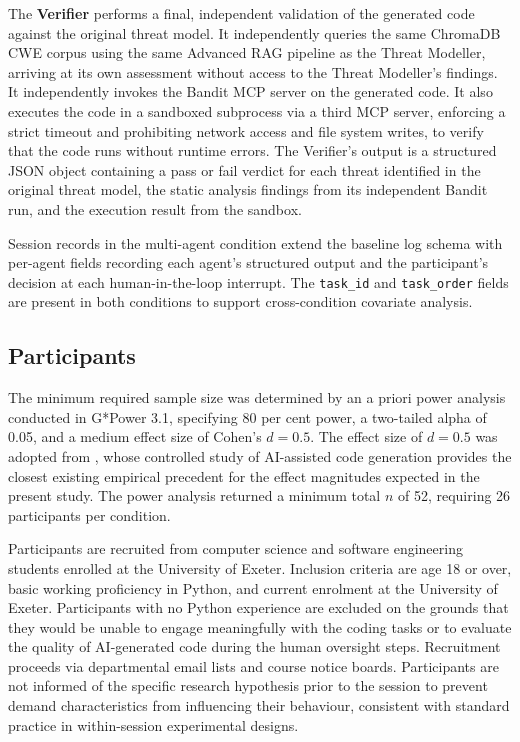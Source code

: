 The \textbf{Verifier} performs a final, independent validation of the generated code against the original threat model. It independently queries the same ChromaDB CWE corpus using the same Advanced RAG pipeline as the Threat Modeller, arriving at its own assessment without access to the Threat Modeller's findings. It independently invokes the Bandit MCP server on the generated code. It also executes the code in a sandboxed subprocess via a third MCP server, enforcing a strict timeout and prohibiting network access and file system writes, to verify that the code runs without runtime errors. The Verifier's output is a structured JSON object containing a pass or fail verdict for each threat identified in the original threat model, the static analysis findings from its independent Bandit run, and the execution result from the sandbox.

Session records in the multi-agent condition extend the baseline log schema with per-agent fields recording each agent's structured output and the participant's decision at each human-in-the-loop interrupt. The \texttt{task\_id} and \texttt{task\_order} fields are present in both conditions to support cross-condition covariate analysis.

\subsection{Participants}

The minimum required sample size was determined by an a priori power analysis conducted in G*Power 3.1, specifying 80 per cent power, a two-tailed alpha of 0.05, and a medium effect size of Cohen's $d = 0.5$. The effect size of $d = 0.5$ was adopted from \citet{perry2023}, whose controlled study of AI-assisted code generation provides the closest existing empirical precedent for the effect magnitudes expected in the present study. The power analysis returned a minimum total $n$ of 52, requiring 26 participants per condition.

Participants are recruited from computer science and software engineering students enrolled at the University of Exeter. Inclusion criteria are age 18 or over, basic working proficiency in Python, and current enrolment at the University of Exeter. Participants with no Python experience are excluded on the grounds that they would be unable to engage meaningfully with the coding tasks or to evaluate the quality of AI-generated code during the human oversight steps. Recruitment proceeds via departmental email lists and course notice boards. Participants are not informed of the specific research hypothesis prior to the session to prevent demand characteristics from influencing their behaviour, consistent with standard practice in within-session experimental designs.

